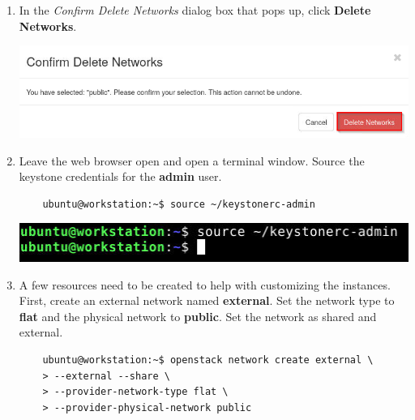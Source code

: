 \documentclass[letterpaper, 12pt]{article}
\begin{document}
\begin{enumerate}
    \item In the \textit{Confirm Delete Networks} dialog box that pops up, click \textbf{Delete Networks}.

    \begin{center}
        \includegraphics[width=\linewidth]{images/part1/step5.png}
    \end{center}

    \item Leave the web browser open and open a terminal window. Source the keystone credentials for the \textbf{admin}
    user.
    \begin{lstlisting}
    ubuntu@workstation:~$ source ~/keystonerc-admin
    \end{lstlisting}

    \begin{center}
        \includegraphics[width=\linewidth]{images/part1/step6.png}
    \end{center}

    \item A few resources need to be created to help with customizing the instances. First, create an external network
    named \textbf{external}. Set the network type to \textbf{flat} and the physical network to \textbf{public}. Set the
    network as shared and external.
    \begin{lstlisting}
    ubuntu@workstation:~$ openstack network create external \
    > --external --share \
    > --provider-network-type flat \
    > --provider-physical-network public
    \end{lstlisting}


\end{enumerate}
\end{document}
